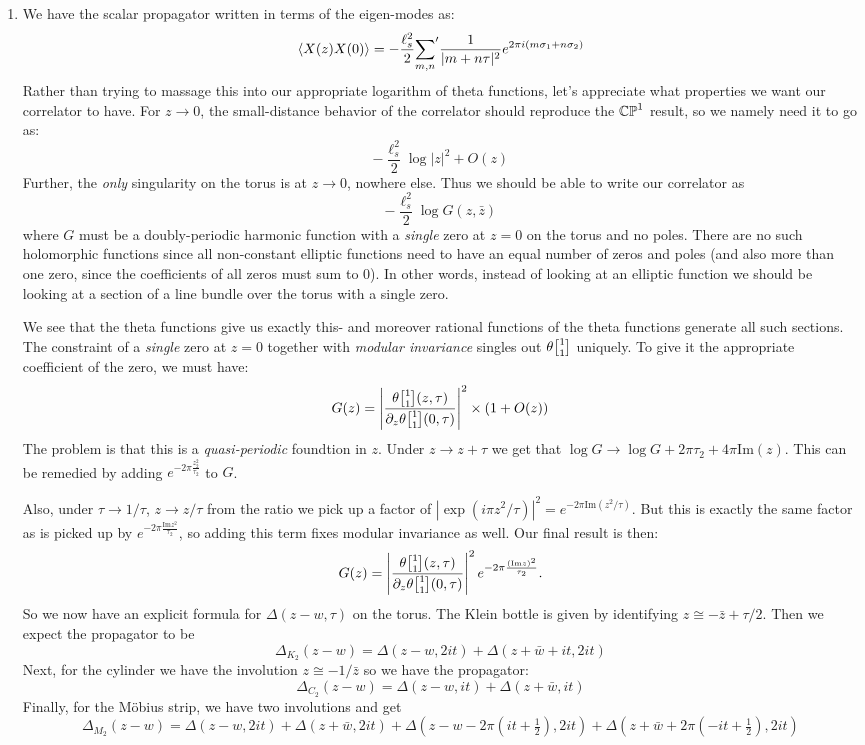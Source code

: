 \documentclass[11pt]{article}
\begin{document}
\begin{enumerate}
	
	\item We have the scalar propagator written in terms of the eigen-modes as:
	\[
		\braket{X(z) X(0)} = -\frac{\ell_s^2}{2} {\sum_{m,n}}' \frac{1}{|m + n \tau|^2} e^{2\pi i (m \sigma_1 + n \sigma_2)}
	\]
	Rather than trying to massage this into our appropriate logarithm of theta functions, let's appreciate what properties we want our correlator to have. For $z \to 0$, the small-distance behavior of the correlator should reproduce the $\mathbb{CP}^1$ result, so we namely need it to go as:
	\[
		 - \frac{\ell_s^2}{2} \log|z|^2 + O(z)
	\]
	Further, the \emph{only} singularity on the torus is at $z \to 0$, nowhere else. Thus we should be able to write our correlator as 
	\[
		- \frac{\ell_s^2}{2} \log G(z, \bar z)
	\]
	where $G$ must be a doubly-periodic harmonic function with a \emph{single} zero at $z=0$ on the torus and no poles. There are no such holomorphic functions since all non-constant elliptic functions need to have an equal number of zeros and poles (and also more than one zero, since the coefficients of all zeros must sum to 0). In other words, instead of looking at an elliptic function we should be looking at a section of a line bundle over the torus with a single zero. 
	
	We see that the theta functions give us exactly this- and moreover rational functions of the theta functions generate all such sections. The constraint of a \emph{single} zero at $z=0$ together with \emph{modular invariance} singles out $\theta\twist11$ uniquely. To give it the appropriate coefficient of the zero, we must have:
	\[
		G(z) = \left|\frac{\theta\twist11(z, \tau)}{\d_z \theta\twist11(0, \tau)} \right|^2 \times (1 + O(z))
	\]
	The problem is that this is a \emph{quasi-periodic} foundtion in $z$. Under $z \to z + \tau$ we get that $\log G \to \log G + 2 \pi \tau_2 + 4 \pi \mathrm{Im}(z)$. This can be remedied by adding $e^{- 2 \pi \frac{z_2^2}{\tau_2}}$ to $G$. 
	
	Also,  under $\tau \to 1/\tau$, $z \to z/\tau$ from the ratio we pick up a factor of $|\exp(i \pi z^2/\tau)|^2 = e^{- 2 \pi \mathrm{Im} (z^2/\tau)}$. But this is exactly the same factor as is picked up by $e^{-2 \pi \frac{\mathrm{Im} z^2}{\tau_2}}$, so adding this term fixes modular invariance as well.
	 Our final result is then:
	\[
		G(z) = \left|\frac{\theta\twist11(z, \tau)}{\d_z \theta\twist11(0, \tau)} \right|^2 e^{-2 \pi \frac{(\mathrm{Im} z)^2}{\tau_2}}.
	\]
	So we now have an explicit formula for $\Delta(z - w, \tau)$ on the torus. The Klein bottle is given by identifying $z \cong - \bar z + \tau/2$. Then we expect the propagator to be
	\[
		\Delta_{K_2}(z- w) = \Delta(z - w, 2 i t) + \Delta(z + \bar w + i t, 2 i t)
	\] 
	Next, for the cylinder we have the involution $z \cong -1/\bar z$ so we have the propagator:
	\[
		\Delta_{C_2}(z- w) = \Delta(z - w, i t) + \Delta(z + \bar w, i t)
	\]
	Finally, for the M\"obius strip, we have two involutions and get
	\[
		\Delta_{M_2}(z- w) = \Delta(z - w, 2 i t) + \Delta(z + \bar w, 2 i t) + \Delta(z - w - 2 \pi (i t + \tfrac12) , 2 i t) + \Delta(z + \bar w + 2 \pi (-i t + \tfrac12) , 2 i t)
	\]
	

\end{enumerate}
\end{document}
